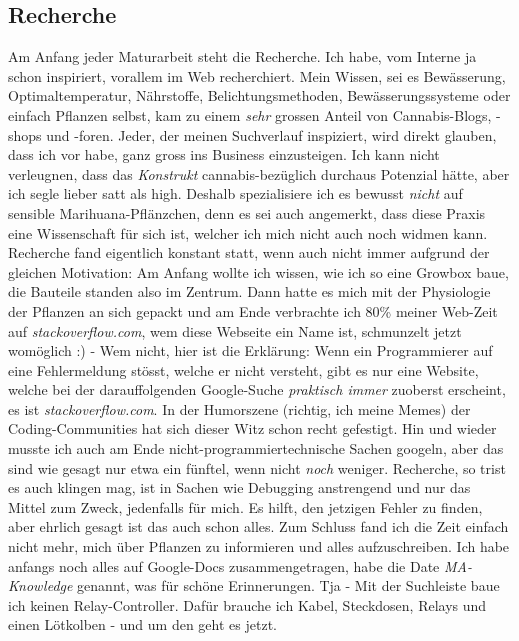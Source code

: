 \documentclass[12pt,titlepage,a4paper]{article}
\begin{document}
\subsection{Recherche}
Am Anfang jeder Maturarbeit steht die Recherche. Ich habe, vom Interne ja schon inspiriert, vorallem im Web recherchiert. Mein Wissen, sei es Bewässerung, Optimaltemperatur, Nährstoffe, Belichtungsmethoden, Bewässerungssysteme oder einfach Pflanzen selbst, kam zu einem \textit{sehr} grossen Anteil von Cannabis-Blogs, -shops und -foren. Jeder, der meinen Suchverlauf inspiziert, wird direkt glauben, dass ich vor habe, ganz gross ins Business einzusteigen. Ich kann nicht verleugnen, dass das \textit{Konstrukt} cannabis-bezüglich durchaus Potenzial hätte, aber ich segle lieber satt als high. Deshalb spezialisiere ich es bewusst \textit{nicht} auf sensible Marihuana-Pflänzchen, denn es sei auch angemerkt, dass diese Praxis eine Wissenschaft für sich ist, welcher ich mich nicht auch noch widmen kann. \\ Recherche fand eigentlich konstant statt, wenn auch nicht immer aufgrund der gleichen Motivation: Am Anfang wollte ich wissen, wie ich so eine Growbox baue, die Bauteile standen also im Zentrum. Dann hatte es mich mit der Physiologie der Pflanzen an sich gepackt und am Ende verbrachte ich 80\% meiner Web-Zeit auf \textit{stackoverflow.com}, wem diese Webseite ein Name ist, schmunzelt jetzt womöglich :) - Wem nicht, hier ist die Erklärung: Wenn ein Programmierer auf eine Fehlermeldung stösst, welche er nicht versteht, gibt es nur eine Website, welche bei der darauffolgenden Google-Suche \textit{praktisch immer} zuoberst erscheint, es ist \textit{stackoverflow.com}. In der Humorszene (richtig, ich meine Memes) der Coding-Communities hat sich dieser Witz schon recht gefestigt. Hin und wieder musste ich auch am Ende nicht-programmiertechnische Sachen googeln, aber das sind wie gesagt nur etwa ein fünftel, wenn nicht \textit{noch} weniger. Recherche, so trist es auch klingen mag, ist in Sachen wie Debugging anstrengend und nur das Mittel zum Zweck, jedenfalls für mich. Es hilft, den jetzigen Fehler zu finden, aber ehrlich gesagt ist das auch schon alles. Zum Schluss fand ich die Zeit einfach nicht mehr, mich über Pflanzen zu informieren und alles aufzuschreiben. Ich habe anfangs noch alles auf Google-Docs zusammengetragen, habe die Date \textit{MA-Knowledge} genannt, was für schöne Erinnerungen. Tja - Mit der Suchleiste baue ich keinen Relay-Controller. Dafür brauche ich Kabel, Steckdosen, Relays und einen Lötkolben - und um den geht es jetzt.
\end{document}
